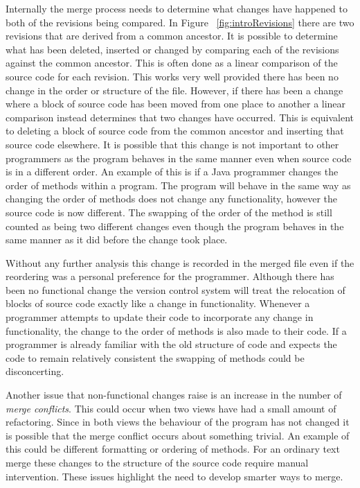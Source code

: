 Internally the merge process needs to determine what changes have happened to both of the revisions being compared. In Figure  ~\ref{fig:introRevisions} there are two revisions that are derived from a common ancestor. It is possible to determine what has been deleted, inserted or changed by comparing each of the revisions against the common ancestor.  This is often done as a linear comparison of the source code for each revision. This works very well provided there has been no change in the order or structure of the file. However, if there has been a change where a block of source code has been moved from one place to another a linear comparison instead determines that two changes have occurred.  This is equivalent to deleting a block of source code from the common ancestor and inserting that source code elsewhere. It is possible that this change is not important to other programmers as the program behaves in the same manner even when source code is in a different order.  An example of this is if a Java programmer changes the order of methods within a program.  The program will behave in the same way as changing the order of methods does not change any functionality, however the source code is now different. The swapping of the order of the method is still counted as being two different changes even though the program behaves in the same manner as it did before the change took place.

Without any further analysis this change is recorded in the merged file even if the reordering was a personal preference for the programmer.  Although there has been no functional change the version control system will treat the relocation of blocks of source code exactly like a change in functionality.  Whenever a programmer attempts to update their code to incorporate any change in functionality, the change to the order of methods is also made to their code.  If a programmer is already familiar with the old structure of code and expects the code to remain relatively consistent the swapping of methods could be disconcerting.

Another issue that non-functional changes raise is an increase in the number of \emph{merge conflicts}. This could occur when two views have had a small amount of refactoring.  Since in both views the behaviour of the program has not changed it is possible that the merge conflict occurs about something trivial. An example of this could be different formatting or ordering of methods. For an ordinary text merge these changes to the structure of the source code require manual intervention. These issues highlight the need to develop smarter ways to merge.

